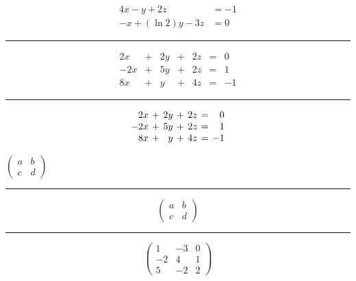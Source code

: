 \documentclass{article}
\begin{document}

\lipsum[1][1-3]
\begin{align*}
4x - y + 2z		& = -1 \\
-x + (\ln 2)y - 3z	& = 0 %
\end{align*}
\lipsum[1][4-5]

\bigskip
\hrule
\bigskip

\lipsum[1][1-3]
\[
\begin{array}{*{7}{r}} %
2x & + & 2y & + & 2z & = & 0 \\
-2x & + & 5y & + & 2z & = & 1 \\
8x & + & y & + & 4z & = & -1 %
\end{array}
\]
\lipsum[1][4-5]

\bigskip
\hrule
\bigskip

\lipsum[1][1-3]
\[
\arraycolsep = 0.66 mm
\begin{array}{*{7}{r}}
2x & + & 2y & + & 2z & = & 0 \\
-2x & + & 5y & + & 2z & = & 1 \\
8x & + & y & + & 4z & = & -1 \\
\end{array}
\]
\lipsum[1][4-5]

\newpage


\lipsum[1][1-2]
$\begin{pmatrix}
a & b \\
c & d %
\end{pmatrix}$
\lipsum[1][3-5]

\bigskip
\hrule
\bigskip

\lipsum[1][1-3]
\[
\begin{pmatrix}
a & b \\
c & d %
\end{pmatrix}
\]
\lipsum[1][4-5]

\bigskip
\hrule
\bigskip

\[
\begin{pmatrix}
1 & -3 & 0 \\
-2 & 4 & 1 \\
5 & -2 & 2
\end{pmatrix}
\]
\end{document}
